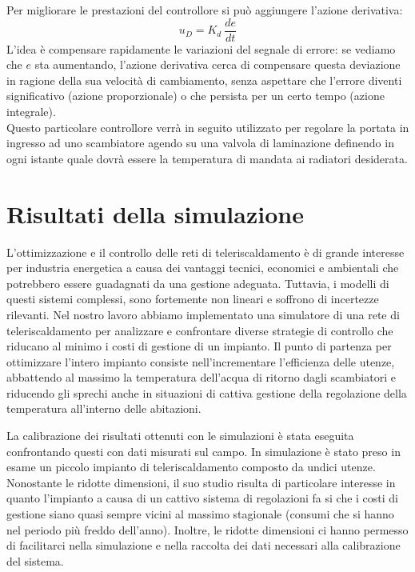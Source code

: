 \documentclass[laurea,oneside,11pt]{USiena_tesiLM}
\begin{document}
Per migliorare le prestazioni del controllore si può aggiungere l'azione derivativa:
\begin{equation}
u_D = K_d \ \dfrac{de}{dt} 
\end{equation}
L'idea è compensare rapidamente le variazioni del segnale di errore: se vediamo che $e$ sta aumentando, l'azione derivativa cerca di compensare questa deviazione in ragione della sua velocità di cambiamento, senza aspettare che l'errore diventi significativo (azione proporzionale) o che persista per un certo tempo (azione integrale). \\

Questo particolare controllore verrà in seguito utilizzato per regolare la portata in ingresso ad uno scambiatore agendo su una valvola di laminazione definendo in ogni istante quale dovrà essere la temperatura di mandata ai radiatori desiderata.

\chapter{Risultati della simulazione}
L'ottimizzazione e il controllo delle reti di teleriscaldamento è di grande interesse per industria energetica a causa dei vantaggi tecnici, economici e ambientali che potrebbero essere guadagnati da una gestione adeguata. Tuttavia, i modelli di questi sistemi complessi, sono fortemente non lineari  e soffrono di incertezze rilevanti. Nel nostro lavoro abbiamo implementato una simulatore di una rete di teleriscaldamento per analizzare e confrontare diverse strategie di controllo che riducano al minimo i costi di gestione di un impianto.
Il punto di partenza per ottimizzare l'intero impianto consiste nell'incrementare l'efficienza delle utenze, abbattendo al massimo la temperatura dell'acqua di ritorno dagli scambiatori 
e riducendo gli sprechi anche in situazioni di cattiva gestione 
della regolazione della temperatura all'interno delle abitazioni.

La calibrazione dei risultati ottenuti con le simulazioni è stata eseguita confrontando questi con dati misurati sul campo.
In simulazione è stato preso in esame un piccolo impianto di teleriscaldamento composto da undici utenze. Nonostante le ridotte dimensioni, il suo studio risulta di particolare interesse in quanto l'impianto a causa di un cattivo sistema di regolazioni fa si che i costi di gestione siano quasi sempre vicini al massimo stagionale (consumi che si hanno nel periodo più freddo dell'anno). Inoltre, le ridotte dimensioni ci hanno permesso di facilitarci nella simulazione e nella raccolta dei dati necessari alla calibrazione del sistema.  
\end{document}
